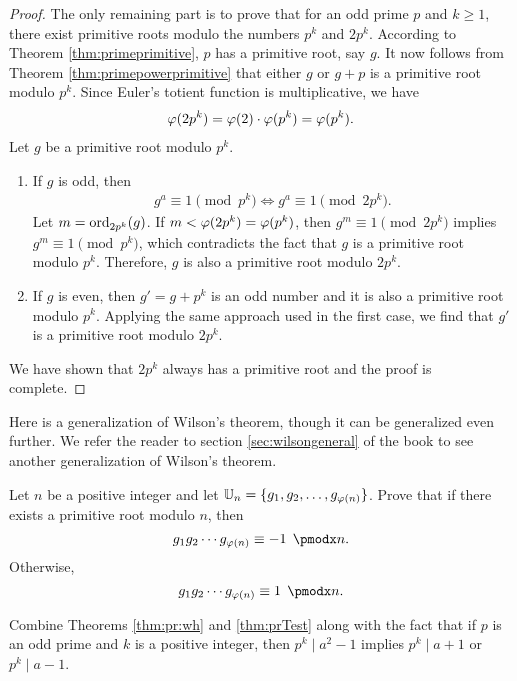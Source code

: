 \documentclass{subfile}
\begin{document}
\begin{proof}
		The only remaining part is to prove that for an odd prime $p$ and $k \geq 1$, there exist primitive roots modulo the numbers $p^k$ and $2p^k$. According to Theorem \ref{thm:primeprimitive}, $p$ has a primitive root, say $g$. It now follows from Theorem \ref{thm:primepowerprimitive} that either $g$ or $g+p$ is a primitive root modulo $p^k$. Since Euler's totient function is multiplicative, we have
			\begin{align*}
				\varphi(2p^k) = \varphi(2)\cdot \varphi(p^k) = \varphi(p^k).
			\end{align*}
		Let $g$ be a primitive root modulo $p^k$. 
		\begin{enumerate}
			\item If $g$ is odd, then
			\begin{align*}
			g^a \equiv 1 \pmod{p^k} \iff g^a \equiv 1 \pmod{2p^k}.
			\end{align*} 
			Let $m = \operatorname{ord}_{2p^k}(g)$. If $m<\varphi(2p^k)=\varphi(p^k)$, then $g^m \equiv 1\pmod{2p^k}$ implies $g^m \equiv 1\pmod{p^k}$, which contradicts the fact that $g$ is a primitive root modulo $p^k$. Therefore, $g$ is also a primitive root modulo $2p^k$. 
			\item If $g$ is even, then $g'=g+p^k$ is an odd number and it is also a primitive root modulo $p^k$. Applying the same approach used in the first case, we find that $g'$ is a primitive root modulo $2p^k$.
		\end{enumerate}
		We have shown that $2p^k$ always has a primitive root and the proof is complete.
	\end{proof}

Here is a generalization of Wilson's theorem, though it can be generalized even further. We refer the reader to section \eqref{sec:wilsongeneral} of the book to see another generalization of Wilson's theorem.
	\begin{problem}\label{thm:genWilson}
		Let $n$ be a positive integer and let $\mathbb U_n = \{g_1, g_2, \ldots, g_{\varphi(n)}\}$. Prove that if there exists a primitive root modulo $n$, then 
		\[g_1g_2\cdots g_{\t(n)}\equiv-1\pmod n.\]
		Otherwise, 
		\[g_1g_2\cdots g_{\t(n)}\equiv1\pmod n.\]
	\end{problem}
	
	\begin{hint}
		Combine Theorems \ref{thm:pr:wh} and \ref{thm:prTest} along with the fact that if $p$ is an odd prime and $k$ is a positive integer, then $p^k \mid a^2-1$ implies $p^k \mid a+1$ or $p^k\mid a-1$.
	\end{hint}
	
\end{document}
